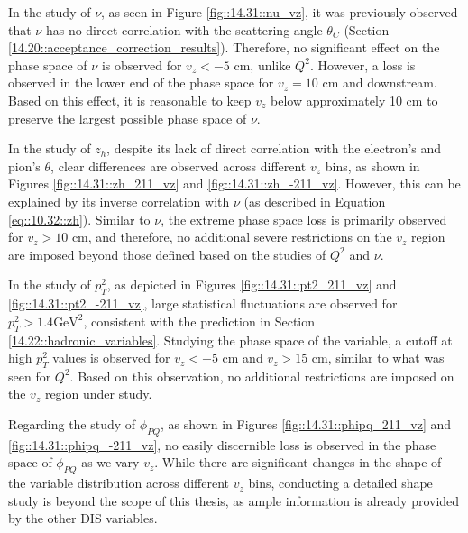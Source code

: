     In the study of $\nu$, as seen in Figure \ref{fig::14.31::nu_vz}, it was previously observed that $\nu$ has no direct correlation with the scattering angle $\theta_C$ (Section \ref{14.20::acceptance_correction_results}).
    Therefore, no significant effect on the phase space of $\nu$ is observed for $v_z < -5$ cm, unlike $Q^2$.
    However, a loss is observed in the lower end of the phase space for $v_z = 10$ cm and downstream.
    Based on this effect, it is reasonable to keep $v_z$ below approximately 10 cm to preserve the largest possible phase space of $\nu$.

    In the study of $z_h$, despite its lack of direct correlation with the electron's and pion's $\theta$, clear differences are observed across different $v_z$ bins, as shown in Figures \ref{fig::14.31::zh_211_vz} and \ref{fig::14.31::zh_-211_vz}.
    However, this can be explained by its inverse correlation with $\nu$ (as described in Equation \eqref{eq::10.32::zh}).
    Similar to $\nu$, the extreme phase space loss is primarily observed for $v_z > 10$ cm, and therefore, no additional severe restrictions on the $v_z$ region are imposed beyond those defined based on the studies of $Q^2$ and $\nu$.

    In the study of $p_T^2$, as depicted in Figures \ref{fig::14.31::pt2_211_vz} and \ref{fig::14.31::pt2_-211_vz}, large statistical fluctuations are observed for $p_T^2 > 1.4 \text{GeV}^2$, consistent with the prediction in Section \ref{14.22::hadronic_variables}.
    Studying the phase space of the variable, a cutoff at high $p_T^2$ values is observed for $v_z < -5$ cm and $v_z > 15$ cm, similar to what was seen for $Q^2$.
    Based on this observation, no additional restrictions are imposed on the $v_z$ region under study.

    Regarding the study of $\phi_{PQ}$, as shown in Figures \ref{fig::14.31::phipq_211_vz} and \ref{fig::14.31::phipq_-211_vz}, no easily discernible loss is observed in the phase space of $\phi_{PQ}$ as we vary $v_z$.
    While there are significant changes in the shape of the variable distribution across different $v_z$ bins, conducting a detailed shape study is beyond the scope of this thesis, as ample information is already provided by the other DIS variables.
